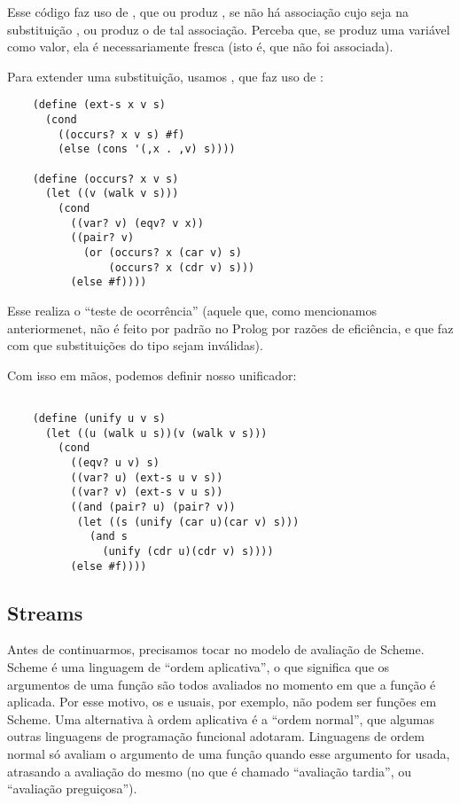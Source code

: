\documentclass{article}
\begin{document}
  \noindent Esse código faz uso de , que ou produz
  , se não há associação cujo  seja
   na substituição , ou produz o
   de tal associação. Perceba que, se 
  produz uma variável como valor, ela é necessariamente fresca (isto
  é, que não foi associada).

  Para extender uma substituição, usamos , que faz
  uso de :

  \begin{lstlisting}
    (define (ext-s x v s)
      (cond
        ((occurs? x v s) #f)
        (else (cons '(,x . ,v) s))))

    (define (occurs? x v s)
      (let ((v (walk v s)))
        (cond
          ((var? v) (eqv? v x))
          ((pair? v)
            (or (occurs? x (car v) s)
                (occurs? x (cdr v) s)))
          (else #f))))
  \end{lstlisting}

  Esse  realiza o ``teste de ocorrência'' (aquele
  que, como mencionamos anteriormenet, não é feito por padrão no
  Prolog por razões de eficiência, e que faz com que substituições do
  tipo  sejam inválidas).

  Com isso em mãos, podemos definir nosso unificador:

  \begin{lstlisting}

    (define (unify u v s)
      (let ((u (walk u s))(v (walk v s)))
        (cond
          ((eqv? u v) s)
          ((var? u) (ext-s u v s))
          ((var? v) (ext-s v u s))
          ((and (pair? u) (pair? v))
           (let ((s (unify (car u)(car v) s)))
             (and s
               (unify (cdr u)(cdr v) s))))
          (else #f))))

  \end{lstlisting}

  \subsection{Streams}

  Antes de continuarmos, precisamos tocar no modelo de avaliação de
  Scheme. Scheme é uma linguagem de ``ordem aplicativa'', o que
  significa que os argumentos de uma função são todos avaliados no
  momento em que a função é aplicada. Por esse motivo, os
   e  usuais, por exemplo, não podem ser
  funções em Scheme. Uma alternativa à ordem aplicativa é a ``ordem
  normal'', que algumas outras linguagens de programação funcional
  adotaram. Linguagens de ordem normal só avaliam o argumento de uma
  função quando esse argumento for usada, atrasando a avaliação do
  mesmo (no que é chamado ``avaliação tardia'', ou ``avaliação
  preguiçosa'').
\end{document}
